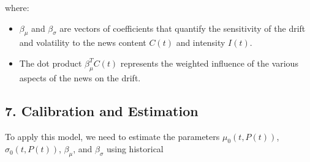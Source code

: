 \documentclass[12pt,article]{memoir}
\begin{document}
where:
\begin{itemize}
    \item \(\beta_{\mu}\) and \(\beta_{\sigma}\) are vectors of coefficients that quantify the sensitivity of the drift and volatility to the news content \(C(t)\) and intensity \(I(t)\).
    \item The dot product \(\beta_{\mu}^T C(t)\) represents the weighted influence of the various aspects of the news on the drift.
\end{itemize}

\subsection*{7. Calibration and Estimation}

To apply this model, we need to estimate the parameters \(\mu_0(t, P(t))\), \(\sigma_0(t, P(t))\), \(\beta_{\mu}\), and \(\beta_{\sigma}\) using historical 
\end{document}
